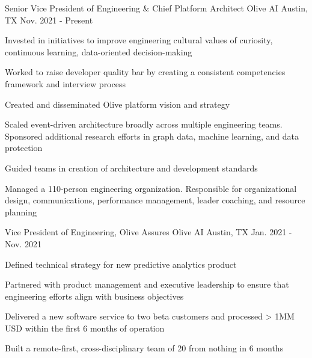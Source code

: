 


\begin{cventries}


\cventry
{Senior Vice President of Engineering \& Chief Platform Architect}
{Olive AI}
{Austin, TX}
{Nov. 2021 - Present}
{
  \begin{cvitems}
    \item{Invested in initiatives to improve engineering cultural values of curiosity, continuous learning, data-oriented decision-making}
    \item{Worked to raise developer quality bar by creating a consistent competencies framework and interview process}
    \item{Created and disseminated Olive platform vision and strategy}
    \item{Scaled event-driven architecture broadly across multiple engineering teams. Sponsored additional research efforts in graph data, machine learning, and data protection}
    \item{Guided teams in creation of architecture and development standards}
    \item{Managed a 110-person engineering organization. Responsible for organizational design, communications, performance management, leader coaching, and resource planning}
  \end{cvitems}
}
    

\cventry
{Vice President of Engineering, Olive Assures}
{Olive AI}
{Austin, TX}
{Jan. 2021 - Nov. 2021}
{
  \begin{cvitems}
    \item {Defined technical strategy for new predictive analytics product}
    \item {Partnered with product management and executive leadership to ensure that engineering efforts align with business objectives}
    \item {Delivered a new software service to two beta customers and processed > 1MM USD within the first 6 months of operation}
    \item {Built a remote-first, cross-disciplinary team of 20 from nothing in 6 months}
  \end{cvitems}
}


\end{cventries}
